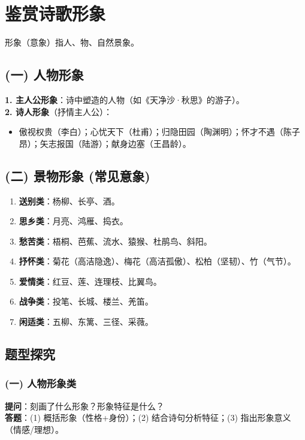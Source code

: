 \documentclass[11pt,a4paper]{article}
\begin{document}
\section{鉴赏诗歌形象}

形象（意象）指人、物、自然景象。

\subsection{(一) 人物形象}
\textbf{1. 主人公形象}：诗中塑造的人物（如《天净沙·秋思》的游子）。\\
\textbf{2. 诗人形象}（抒情主人公）：
\begin{itemize}
    \item 傲视权贵（李白）；心忧天下（杜甫）；归隐田园（陶渊明）；怀才不遇（陈子昂）；矢志报国（陆游）；献身边塞（王昌龄）。
\end{itemize}

\subsection{(二) 景物形象 (常见意象)}
\begin{enumerate}
    \item \textbf{送别类}：杨柳、长亭、酒。
    \item \textbf{思乡类}：月亮、鸿雁、捣衣。
    \item \textbf{愁苦类}：梧桐、芭蕉、流水、猿猴、杜鹃鸟、斜阳。
    \item \textbf{抒怀类}：菊花（高洁隐逸）、梅花（高洁孤傲）、松柏（坚韧）、竹（气节）。
    \item \textbf{爱情类}：红豆、莲、连理枝、比翼鸟。
    \item \textbf{战争类}：投笔、长城、楼兰、羌笛。
    \item \textbf{闲适类}：五柳、东篱、三径、采薇。
\end{enumerate}

\subsection{题型探究}

\subsubsection{(一) 人物形象类}
\textbf{提问}：刻画了什么形象？形象特征是什么？\\
\textbf{答题}：(1) 概括形象（性格+身份）；(2) 结合诗句分析特征；(3) 指出形象意义（情感/理想）。
\end{document}
